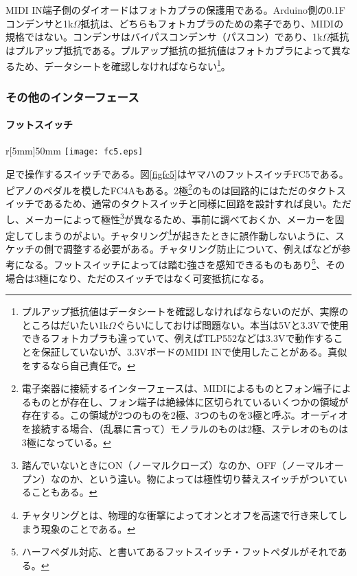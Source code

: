 \documentclass[uplatex, 10pt, dvipdfmx]{jsarticle}
\numberwithin{equation}{section}
\begin{document}
MIDI IN端子側のダイオードはフォトカプラの保護用である。Arduino側の0.1{\textmu}Fコンデンサと1k$\Omega$抵抗は、どちらもフォトカプラのための素子であり、MIDIの規格ではない。コンデンサはバイパスコンデンサ（パスコン）であり、1k$\Omega$抵抗はプルアップ抵抗である。プルアップ抵抗の抵抗値はフォトカプラによって異なるため、データシートを確認しなければならない\footnote{プルアップ抵抗値はデータシートを確認しなければならないのだが、実際のところはだいたい1k$\Omega$ぐらいにしておけば問題ない。本当は5Vと3.3Vで使用できるフォトカプラも違っていて、例えばTLP552などは3.3Vで動作することを保証していないが、3.3VボードのMIDI INで使用したことがある。真似をするなら自己責任で。}。

\subsubsection{その他のインターフェース}
\paragraph{フットスイッチ}

\begin{wrapfigure}{r}[5mm]{50mm}
  \centering
  \texttt{[image: fc5.eps]}
  \caption{ヤマハFC5。画像は\href{https://jp.yamaha.com/products/music_production/accessories/fc5/index.html}{ヤマハ公式サイト}から引用。}
  \label{figfc5}
\end{wrapfigure}

足で操作するスイッチである。図\ref{figfc5}はヤマハのフットスイッチFC5である。ピアノのペダルを模したFC4Aもある。2極\footnote{電子楽器に接続するインターフェースは、MIDIによるものとフォン端子によるものとが存在し、フォン端子は絶縁体に区切られているいくつかの領域が存在する。この領域が2つのものを2極、3つのものを3極と呼ぶ。オーディオを接続する場合、（乱暴に言って）モノラルのものは2極、ステレオのものは3極になっている。}のものは回路的にはただのタクトスイッチであるため、通常のタクトスイッチと同様に回路を設計すれば良い。ただし、メーカーによって極性\footnote{踏んでいないときにON（ノーマルクローズ）なのか、OFF（ノーマルオープン）なのか、という違い。物によっては極性切り替えスイッチがついていることもある。}が異なるため、事前に調べておくか、メーカーを固定してしまうのがよい。チャタリング\footnote{チャタリングとは、物理的な衝撃によってオンとオフを高速で行き来してしまう現象のことである。}が起きたときに誤作動しないように、スケッチの側で調整する必要がある。チャタリング防止について、例えば\cite{チャタリング防止}などが参考になる。フットスイッチによっては踏む強さを感知できるものもあり\footnote{ハーフペダル対応、と書いてあるフットスイッチ・フットペダルがそれである。}、その場合は3極になり、ただのスイッチではなく可変抵抗になる。
\end{document}
